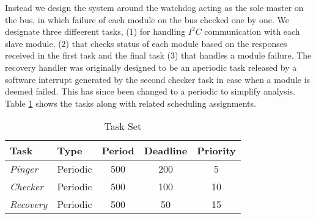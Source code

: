 Instead we design the system around the watchdog acting as the sole master on the bus, in which failure of each module on the bus checked one by one. We designate three diffeerent tasks, (1) for handling $\textit{I}^2\textit{C}$ communication with each slave module, (2) that checks status of each module based on the responses received in the first task and the final task (3) that handles a module failure. The recovery handler was originally designed to be an aperiodic task released by a software interrupt generated by the second checker task in case when a module is deemed failed. This has since been changed to a periodic to simplify analysis. Table \ref{tab:tasks} shows the tasks along with related scheduling assignments.
\begin{center}
	\begin{table}
    \begin{tabular}{ | l | l | c | c | c |}
    \hline
    Task & Type & Period & Deadline & Priority  \\ \hline
    \textit{Pinger} & Periodic & 500 & 200 & 5  \\ \hline
    \textit{Checker} & Periodic & 500 & 100 & 10 \\ \hline
    \textit{Recovery} & Periodic & 500 & 50 &  15 \\
    \hline
    \end{tabular}
    \label{tab:tasks}
     \caption{Task Set}
    \end{table}
\end{center}

